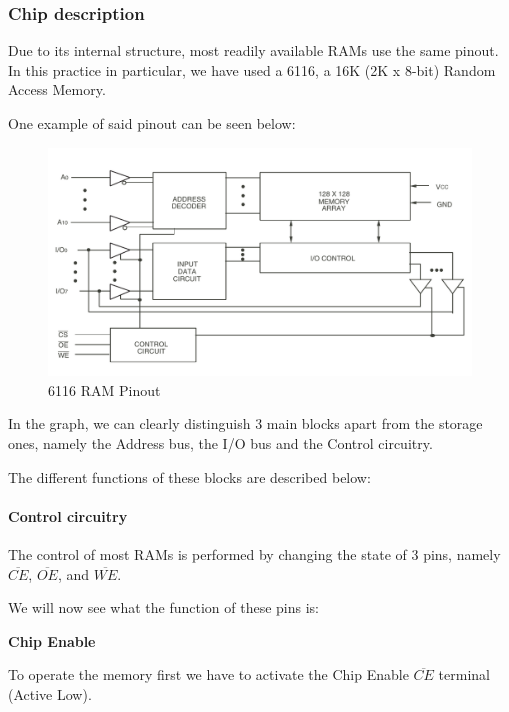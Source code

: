 \subsubsection{Chip description}

Due to its internal structure, most readily available RAMs use the same pinout. In this practice in particular, we have used a 6116, a 16K (2K x 8-bit) Random Access Memory.\medskip

One example of said pinout can be seen below:

\begin{figure}[H]
    \centering
    \includegraphics[scale = 0.8]{Graphics/Practice 6/RAM/RAM_IO.pdf}
    \caption{6116 RAM Pinout ~\autocite{6116}}
    \label{fig:<label>}
\end{figure}

\clearpage

In the graph, we can clearly distinguish 3 main blocks apart from the storage ones, namely the Address bus, the I/O bus and the Control circuitry.\medskip

The different functions of these blocks are described below:

\paragraph{Control circuitry}

The control of most RAMs is performed by changing the state of 3 pins, namely $\overline{CE}$, $\overline{OE}$, and $\overline{WE}$.\medskip

We will now see what the function of these pins is:\medskip


\textbf{Chip Enable} \medskip

To operate the memory first we have to activate the Chip Enable $\overline{CE}$ terminal (Active Low). \medskip


